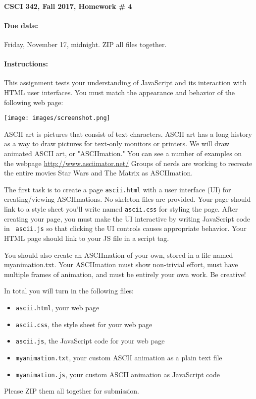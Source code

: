 \documentclass{article}
\newcommand{\myitem}{\paragraph}
\begin{document}
\myitem{CSCI 342, Fall 2017, Homework \# 4}

\myitem{Due date:}  Friday, November 17, midnight.  ZIP all files
together.

\myitem{Instructions:}


This assignment tests your understanding of JavaScript and its
interaction with HTML user interfaces.  You must match the appearance
and behavior of the following web page:

\centerline{\texttt{[image: images/screenshot.png]}}

ASCII art is pictures that consist of text characters.  ASCII art has
a long history as a way to draw pictures for text-only monitors or
printers.  We will draw animated ASCII art, or "ASCIImation." You can
see a number of examples on the webpage
\url{http://www.asciimator.net/} Groups of nerds are working to
recreate the entire movies Star Wars and The Matrix as ASCIImation.

The first task is to create a page {\tt ascii.html} with a user
interface (UI) for creating/viewing ASCIImations.  No skeleton files
are provided.  Your page should link to a style sheet you'll write
named {\tt ascii.css} for styling the page.  After creating your page,
you must make the UI interactive by writing JavaScript code in {\tt
  ascii.js} so that clicking the UI controls causes appropriate
behavior.  Your HTML page should link to your JS file in a script tag.

You should also create an ASCIImation of your own, stored in a file
named myanimation.txt.  Your ASCIImation must show non-trivial effort,
must have multiple frames of animation, and must be entirely your own
work.  Be creative!

In total you will turn in the following
files:
\begin{itemize}
\item {\tt ascii.html}, your web page
\item {\tt ascii.css}, the style sheet for your
  web page
\item {\tt ascii.js}, the JavaScript code for your web page
\item {\tt myanimation.txt}, your custom ASCII animation as a plain text file
\item {\tt myanimation.js}, your custom ASCII animation as JavaScript code
\end{itemize}
Please ZIP them all together for submission.
\end{document}
